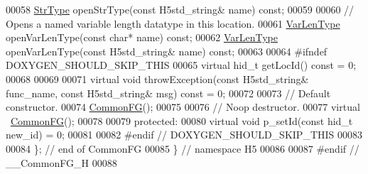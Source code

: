 \begin{DoxyCode}
00058         \hyperlink{class_h5_1_1_str_type}{StrType} openStrType(\textcolor{keyword}{const} H5std\_string& name) \textcolor{keyword}{const};
00059 
00060         \textcolor{comment}{// Opens a named variable length datatype in this location.}
00061         \hyperlink{class_h5_1_1_var_len_type}{VarLenType} openVarLenType(\textcolor{keyword}{const} \textcolor{keywordtype}{char}* name) \textcolor{keyword}{const};
00062         \hyperlink{class_h5_1_1_var_len_type}{VarLenType} openVarLenType(\textcolor{keyword}{const} H5std\_string& name) \textcolor{keyword}{const};
00063 
00064 \textcolor{preprocessor}{#ifndef DOXYGEN\_SHOULD\_SKIP\_THIS}
00065         \textcolor{keyword}{virtual} hid\_t getLocId() \textcolor{keyword}{const} = 0;
00068 
00069 
00071         \textcolor{keyword}{virtual} \textcolor{keywordtype}{void} throwException(\textcolor{keyword}{const} H5std\_string& func\_name, \textcolor{keyword}{const} H5std\_string& msg) \textcolor{keyword}{const} = 0;
00072 
00073         \textcolor{comment}{// Default constructor.}
00074         \hyperlink{class_h5_1_1_common_f_g}{CommonFG}();
00075 
00076         \textcolor{comment}{// Noop destructor.}
00077         \textcolor{keyword}{virtual} ~\hyperlink{class_h5_1_1_common_f_g}{CommonFG}();
00078 
00079     \textcolor{keyword}{protected}:
00080         \textcolor{keyword}{virtual} \textcolor{keywordtype}{void} p\_setId(\textcolor{keyword}{const} hid\_t new\_id) = 0;
00081 
00082 \textcolor{preprocessor}{#endif // DOXYGEN\_SHOULD\_SKIP\_THIS}
00083 
00084 \}; \textcolor{comment}{// end of CommonFG}
00085 \} \textcolor{comment}{// namespace H5}
00086 
00087 \textcolor{preprocessor}{#endif // \_\_CommonFG\_H}
00088 
\end{DoxyCode}
